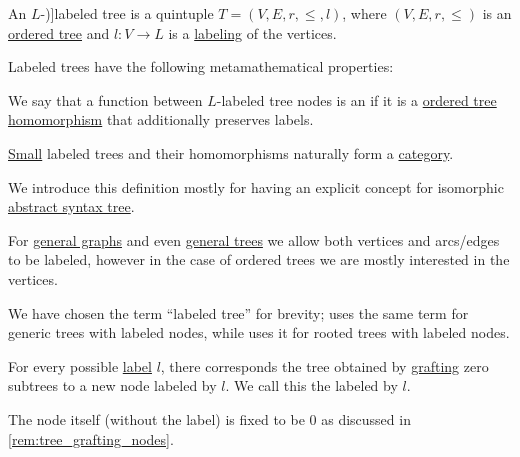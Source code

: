 \begin{definition}\label{def:labeled_tree}\mimprovised
  An \( L \)-\term[en=labeled tree (\cite[exerc. 11.1.38]{Rosen2019DiscreteMathematics})]{labeled tree} is a quintuple \( T = (V, E, r, \leq, l) \), where \( (V, E, r, \leq) \) is an \hyperref[def:ordered_tree]{ordered tree} and \( l: V \to L \) is a \hyperref[def:labeled_set]{labeling} of the vertices.

  Labeled trees have the following metamathematical properties:
  \begin{thmenum}
     We say that a function between \( L \)-labeled tree nodes is an  if it is a \hyperref[def:ordered_tree/morphism]{ordered tree homomorphism} that additionally preserves labels.

     \hyperref[def:small_set]{Small} labeled trees and their homomorphisms naturally form a \hyperref[def:category]{category}.
  \end{thmenum}
\end{definition}
\begin{comments}
  \item We introduce this definition mostly for having an explicit concept for isomorphic \hyperref[con:abstract_syntax_tree]{abstract syntax tree}.

  \item For \hyperref[rem:graph_of_unspecified_type]{general graphs} and even \hyperref[def:tree]{general trees} we allow both vertices and arcs/edges to be labeled, however in the case of ordered trees we are mostly interested in the vertices.

  We have chosen the term \enquote{labeled tree} for brevity; \textcite[471]{Mimram2020ProgramEqualsProof} uses the same term for generic trees with labeled nodes, while \textcite[\S 2.8]{Holtkamp2011RootedTrees} uses it for rooted trees with labeled nodes.
\end{comments}

\begin{definition}\label{def:canonical_singleton_tree}\mimprovised
  For every possible \hyperref[def:labeled_set]{label} \( l \), there corresponds the tree obtained by \hyperref[def:ordered_tree_grafting]{grafting} zero subtrees to a new node labeled by \( l \). We call this the  labeled by \( l \).
\end{definition}
\begin{comments}
  \item The node itself (without the label) is fixed to be \( 0 \) as discussed in \cref{rem:tree_grafting_nodes}.
\end{comments}

